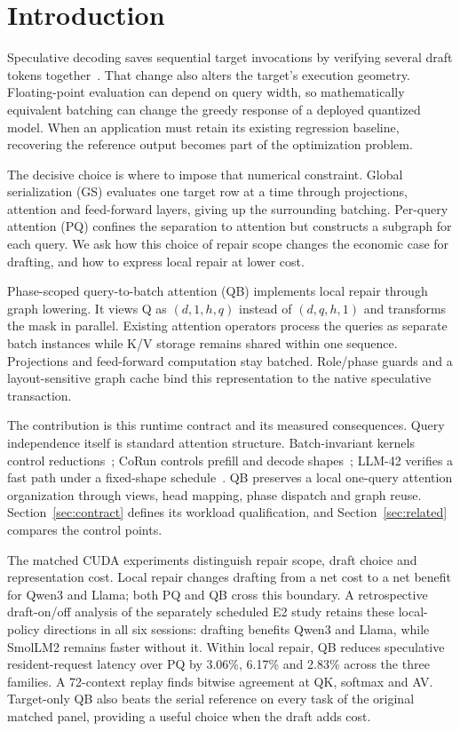 \section{Introduction}
Speculative decoding saves sequential target invocations by verifying several draft tokens together~\cite{leviathan2023,chen2023}. That change also alters the target's execution geometry. Floating-point evaluation can depend on query width, so mathematically equivalent batching can change the greedy response of a deployed quantized model. When an application must retain its existing regression baseline, recovering the reference output becomes part of the optimization problem.

The decisive choice is where to impose that numerical constraint. Global serialization (GS) evaluates one target row at a time through projections, attention and feed-forward layers, giving up the surrounding batching. Per-query attention (PQ) confines the separation to attention but constructs a subgraph for each query. We ask how this choice of repair scope changes the economic case for drafting, and how to express local repair at lower cost.

Phase-scoped query-to-batch attention (QB) implements local repair through graph lowering. It views Q as $(d,1,h,q)$ instead of $(d,q,h,1)$ and transforms the mask in parallel. Existing attention operators process the queries as separate batch instances while K/V storage remains shared within one sequence. Projections and feed-forward computation stay batched. Role/phase guards and a layout-sensitive graph cache bind this representation to the native speculative transaction.

The contribution is this runtime contract and its measured consequences. Query independence itself is standard attention structure. Batch-invariant kernels control reductions~\cite{thinkingmachines}; CoRun controls prefill and decode shapes~\cite{corun}; LLM-42 verifies a fast path under a fixed-shape schedule~\cite{llm42}. QB preserves a local one-query attention organization through views, head mapping, phase dispatch and graph reuse. Section~\ref{sec:contract} defines its workload qualification, and Section~\ref{sec:related} compares the control points.

The matched CUDA experiments distinguish repair scope, draft choice and representation cost. Local repair changes drafting from a net cost to a net benefit for Qwen3 and Llama; both PQ and QB cross this boundary. A retrospective draft-on/off analysis of the separately scheduled E2 study retains these local-policy directions in all six sessions: drafting benefits Qwen3 and Llama, while SmolLM2 remains faster without it. Within local repair, QB reduces speculative resident-request latency over PQ by 3.06\%, 6.17\% and 2.83\% across the three families. A 72-context replay finds bitwise agreement at QK, softmax and AV. Target-only QB also beats the serial reference on every task of the original matched panel, providing a useful choice when the draft adds cost.

